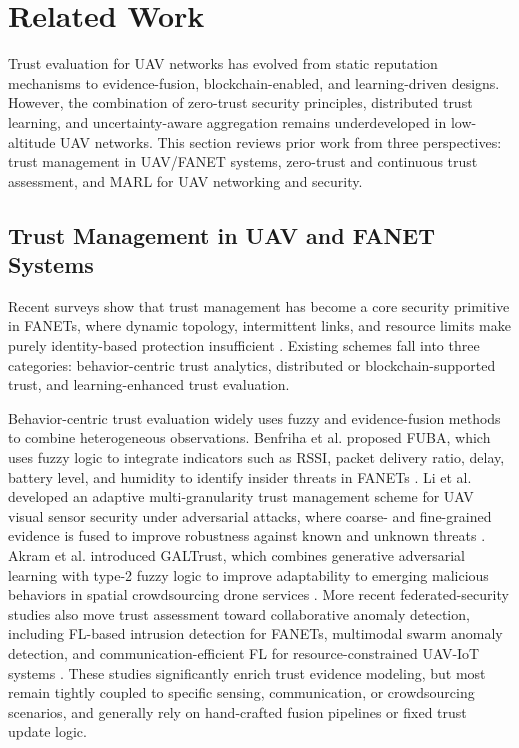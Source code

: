 \documentclass[notspecified,article,submit,moreauthors]{Definitions/mdpi}
\begin{document}
\section{Related Work}
Trust evaluation for UAV networks has evolved from static reputation mechanisms to evidence-fusion, blockchain-enabled, and learning-driven designs. However, the combination of zero-trust security principles, distributed trust learning, and uncertainty-aware aggregation remains underdeveloped in low-altitude UAV networks. This section reviews prior work from three perspectives: trust management in UAV/FANET systems, zero-trust and continuous trust assessment, and MARL for UAV networking and security.

\subsection{Trust Management in UAV and FANET Systems}
Recent surveys show that trust management has become a core security primitive in FANETs, where dynamic topology, intermittent links, and resource limits make purely identity-based protection insufficient \cite{kundu2024survey,noor2020fanet,brik2020fluav,nguyen2021fliotsurvey,qu2021dflun}. Existing schemes fall into three categories: behavior-centric trust analytics, distributed or blockchain-supported trust, and learning-enhanced trust evaluation.

Behavior-centric trust evaluation widely uses fuzzy and evidence-fusion methods to combine heterogeneous observations. Benfriha et al. proposed FUBA, which uses fuzzy logic to integrate indicators such as RSSI, packet delivery ratio, delay, battery level, and humidity to identify insider threats in FANETs \cite{benfriha2024fuba}. Li et al. developed an adaptive multi-granularity trust management scheme for UAV visual sensor security under adversarial attacks, where coarse- and fine-grained evidence is fused to improve robustness against known and unknown threats \cite{li2025multigranularity}. Akram et al. introduced GALTrust, which combines generative adversarial learning with type-2 fuzzy logic to improve adaptability to emerging malicious behaviors in spatial crowdsourcing drone services \cite{akram2024galtrust}. More recent federated-security studies also move trust assessment toward collaborative anomaly detection, including FL-based intrusion detection for FANETs, multimodal swarm anomaly detection, and communication-efficient FL for resource-constrained UAV-IoT systems \cite{ceviz2025flids,lu2024swarmfl,gad2024somkd}. These studies significantly enrich trust evidence modeling, but most remain tightly coupled to specific sensing, communication, or crowdsourcing scenarios, and generally rely on hand-crafted fusion pipelines or fixed trust update logic.
\end{document}
